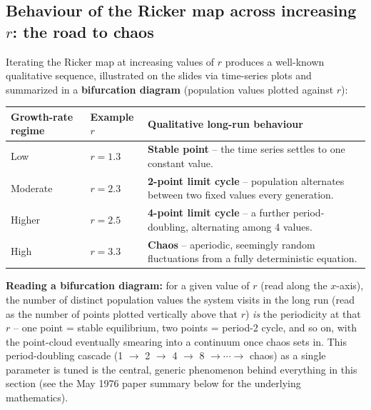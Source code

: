 \documentclass[11pt,a4paper]{article}
\begin{document}
\subsection{Behaviour of the Ricker map across increasing $r$: the road to chaos}
Iterating the Ricker map at increasing values of $r$ produces a well-known qualitative sequence, illustrated on the slides via time-series plots and summarized in a \textbf{bifurcation diagram} (population values plotted against $r$):

\begin{center}
\begin{tabularx}{\textwidth}{@{}l l X@{}}
\toprule
\textbf{Growth-rate regime} & \textbf{Example $r$} & \textbf{Qualitative long-run behaviour} \\
\midrule
Low & $r=1.3$ & \textbf{Stable point} -- the time series settles to one constant value. \\
Moderate & $r=2.3$ & \textbf{2-point limit cycle} -- population alternates between two fixed values every generation. \\
Higher & $r=2.5$ & \textbf{4-point limit cycle} -- a further period-doubling, alternating among 4 values. \\
High & $r=3.3$ & \textbf{Chaos} -- aperiodic, seemingly random fluctuations from a fully deterministic equation. \\
\bottomrule
\end{tabularx}
\end{center}

\begin{keybox}
\textbf{Reading a bifurcation diagram:} for a given value of $r$ (read along the $x$-axis), the number of distinct population values the system visits in the long run (read as the number of points plotted vertically above that $r$) \emph{is} the periodicity at that $r$ -- one point = stable equilibrium, two points = period-2 cycle, and so on, with the point-cloud eventually smearing into a continuum once chaos sets in. This period-doubling cascade (1 $\to$ 2 $\to$ 4 $\to$ 8 $\to \cdots \to$ chaos) as a single parameter is tuned is the central, generic phenomenon behind everything in this section (see the May 1976 paper summary below for the underlying mathematics).
\end{keybox}
\end{document}
